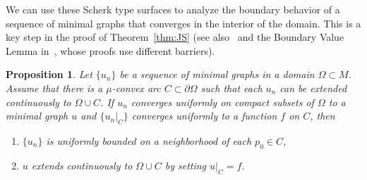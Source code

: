 \documentclass[a4paper,10pt,reqno]{amsart}
\newtheorem{proposition}[theorem]{Proposition}
\theoremstyle{definition}
\theoremstyle{remark}
\numberwithin{equation}{section}
\begin{document}
We can use these Scherk type surfaces to analyze the boundary behavior of a sequence of minimal graphs that converges in the interior of the domain. This is a key step in the proof of Theorem~\ref{thm:JS} (see also~\cite[Lemma~7]{JS} and the Boundary Value Lemma in~\cite{CR}, whose proofs use different barriers). 
	
\begin{proposition}\label{prop:boundary-value}
Let $\{u_n\}$ be a sequence of minimal graphs in a domain $\Omega\subset M$. Assume that there is a $\mu$-convex arc $C\subset\partial\Omega$ such that each $u_n$ can be extended continuously to $\Omega\cup C$. If $u_n$ converges uniformly on compact subsets of $\Omega$ to a minimal graph $u$ and $\{u_n|_C\}$ converges uniformly to a function $f$ on $C$, then 
\begin{enumerate}[label=\emph{(\alph*)}]
	\item $\{u_n\}$ is uniformly bounded on a neighborhood of each $p_0\in C$,
	\item $u$ extends continuously to $\Omega\cup C$ by setting $u|_{C}=f$.
\end{enumerate}

\end{proposition}
\end{document}

